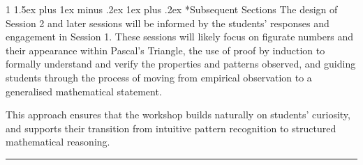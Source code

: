 \documentclass[a4paper,twoside,notitlepage,
11pt,
]{amsart}
\makeatletter
\renewcommand{\section}{\@startsection
  {section}%
  {1}%
  {\z@}%
  {1.5ex plus 1ex minus .2ex}%
  {1ex plus .2ex}%
  {\normalfont\bfseries}}%
\makeatother
\begin{document}
\section*{Subsequent Sections}
The design of Session 2 and later sessions will be informed by the students' responses and engagement in Session 1. These sessions will likely focus on figurate numbers and their appearance within Pascal's Triangle, the use of proof by induction to formally understand and verify the properties and patterns observed, and guiding students through the process of moving from empirical observation to a generalised mathematical statement.

This approach ensures that the workshop builds naturally on students' curiosity, and supports their transition from intuitive pattern recognition to structured mathematical reasoning.
\hrule
\end{document}
